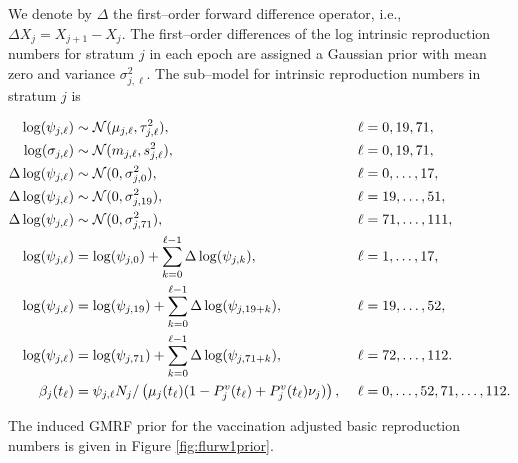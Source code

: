 We denote by $ \Delta $ the first--order forward difference operator, i.e., $ \Delta X_j = X_{j+1} - X_j $. The first--order differences of the log intrinsic reproduction numbers for stratum $ j $ in each epoch are assigned a Gaussian prior with mean zero and variance $ \sigma^2_{j,\ell} $. The sub--model for intrinsic reproduction numbers in stratum $ j $ is

\begin{small}
	\begin{align}
	\log(\psi_{j,\ell}) &\sim \mcN(\mu_{j,\ell},\tau_{j,\ell}^2),&\ &\ell= 0,19,71, \nonumber\\
	\log(\sigma_{j,\ell}) &\sim \mcN(m_{j,\ell}, s_{j,\ell}^2),&\ &\ell=0,19,71, \nonumber\\
	\Delta\log(\psi_{j,\ell})&\sim \mcN(0, \sigma^2_{j,0}),&\ &\ell=0,\dots,17, \nonumber\\
	\Delta\log(\psi_{j,\ell})&\sim \mcN(0, \sigma^2_{j,19}),&\ &\ell=19,\dots,51, \nonumber\\
	\Delta\log(\psi_{j,\ell})&\sim \mcN(0, \sigma^2_{j,71}),&\ &\ell=71,\dots,111, \nonumber\\
	\log(\psi_{j,\ell}) &= \log(\psi_{j,0}) + \sum_{k=0}^{\ell-1}\Delta\log(\psi_{j,k}),&\ &\ell = 1,\dots,17, \nonumber\\
	\log(\psi_{j,\ell}) &= \log(\psi_{j,19}) + \sum_{k=0}^{\ell-1}\Delta\log(\psi_{j,19+k}),&\ &\ell = 19,\dots,52, \nonumber\\
	\log(\psi_{j,\ell}) &= \log(\psi_{j,71}) + \sum_{k=0}^{\ell-1}\Delta\log(\psi_{j,71+k}),&\ &\ell = 72,\dots,112. \nonumber \\
	\beta_j(t_\ell) &= \psi_{j,\ell}N_j/\left (\mu_{j}(t_\ell)(1 - P^v_j(t_\ell) + P_j^v(t_\ell)\nu_j)\right ),&\ &\ell=0,\dots,52,71,\dots,112. \nonumber
	\end{align}
\end{small}

The induced GMRF prior for the vaccination adjusted basic reproduction numbers is given in Figure \ref{fig:flurw1prior}. 

